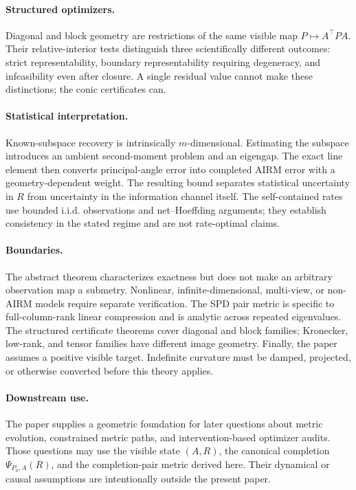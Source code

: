 \paragraph{Structured optimizers.}
Diagonal and block geometry are restrictions of the same visible map
\(P\mapsto A^\top PA\).  Their relative-interior tests distinguish three
scientifically different outcomes: strict representability, boundary
representability requiring degeneracy, and infeasibility even after closure.
A single residual value cannot make these distinctions; the conic certificates
can.

\paragraph{Statistical interpretation.}
Known-subspace recovery is intrinsically \(m\)-dimensional.  Estimating the
subspace introduces an ambient second-moment problem and an eigengap.  The exact
line element then converts principal-angle error into completed AIRM error
with a geometry-dependent weight.  The resulting bound separates statistical
uncertainty in \(R\) from uncertainty in the information channel itself.  The
self-contained rates use bounded i.i.d. observations and net--Hoeffding
arguments; they establish consistency in the stated regime and are not
rate-optimal claims.

\paragraph{Boundaries.}
The abstract theorem characterizes exactness but does not make an arbitrary
observation map a submetry.  Nonlinear, infinite-dimensional, multi-view, or
non-AIRM models require separate verification.  The SPD pair metric is
specific to full-column-rank linear compression and is analytic across
repeated eigenvalues.  The structured certificate
theorems cover diagonal and block families; Kronecker, low-rank, and tensor
families have different image geometry.  Finally, the paper assumes a
positive visible target.  Indefinite curvature must be damped, projected, or
otherwise converted before this theory applies.

\paragraph{Downstream use.}
The paper supplies a geometric foundation for later questions about metric
evolution, constrained metric paths, and intervention-based optimizer audits.
Those questions may use the visible state \((A,R)\), the canonical completion
\(\Psi_{P_0,A}(R)\), and the completion-pair metric derived here.  Their
dynamical or causal assumptions are intentionally outside the present paper.
